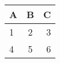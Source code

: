 \documentclass{article}
\begin{document}
    \begin{center}
        \begin{tabular}{l c r}
            \toprule
            A & B & C \\
            \midrule
            1 & 2 & 3 \\
            4 & 5 & 6 \\
            \bottomrule
        \end{tabular}
    \end{center}
\end{document}
